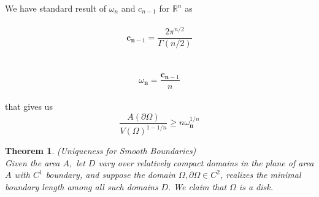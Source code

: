 \documentclass[oneside]{book}
\newtheorem{theorem}{Theorem}[section]
\begin{document}
We have standard result of $\omega_{n}$ and $c_{n-1}$ for $\mathbb{R}^{n}$ as  \\\\
    \begin{equation}
    \label{eq7}  
\mathbf{c}_{\mathbf{n}-1} = \frac{2 \pi^{n / 2}}{\Gamma(n / 2)}
    \end{equation}
    \\\\
        \begin{equation}
        \label{eq8}  
 \omega_{\mathbf{n} } = \frac{\mathbf{c}_{\mathbf{n}-1}}{n}  
    \end{equation} \\
that gives us \\
    \begin{equation}
    \label{eq9}  
 \frac{A(\partial \Omega)}{V(\Omega)^{1-1 / n}} \geq n \omega_{\mathbf{n}}^{1 / n}
    \end{equation}






\begin{theorem}
{(Uniqueness for Smooth Boundaries)}
\label{t:1} \\
 Given
the area $A,$ let $D$ vary over relatively compact domains in the plane of area $A$
with $C^{1}$ boundary, and suppose the domain $\Omega, \partial \Omega \in C^{2}$, realizes the minimal
boundary length among all such domains $D .$ We claim that $\Omega$ is a disk.
\end{theorem}
\end{document}
